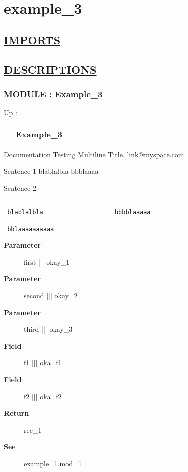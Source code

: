 \chapter*{example\_3}
\hypertarget{ecldoc:toc:example_3}{}

\section*{\underline{IMPORTS}}

\section*{\underline{DESCRIPTIONS}}
\subsection*{MODULE : Example\_3}
\hypertarget{ecldoc:Example_3}{}
\hyperlink{ecldoc:toc:root}{Up} :

{\renewcommand{\arraystretch}{1.5}
\begin{tabularx}{\textwidth}{|>{\raggedright\arraybackslash}l|X|}
\hline
\hspace{0pt} & Example\_3 \\
\hline
\end{tabularx}
}

\par
Documentation Testing Multiline Title. link@myspace.com 
\par
 Sentence 1 blablalbla bbblaaaa 


\par
 Sentence 2 


\begin{verbatim}

 blablalbla                    bbbblaaaaa

 bblaaaaaaaaaa
 \end{verbatim}



\par
\begin{description}
\item [\textbf{Parameter}] first ||| okay\_1
\item [\textbf{Parameter}] second ||| okay\_2
\item [\textbf{Parameter}] third ||| okay\_3
\item [\textbf{Field}] f1 ||| oka\_f1
\item [\textbf{Field}] f2 ||| oka\_f2
\item [\textbf{Return}] rec\_1
\item [\textbf{See}] example\_1.mod\_1
\end{description}

